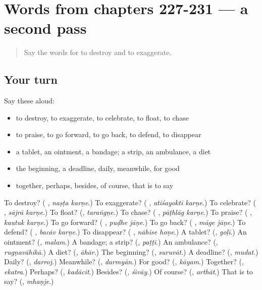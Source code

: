 \section[(dialogue)]{Words from chapters 227-231 — a second pass}

\label{lesson:MR-R231-second-pass-words-from-chapters-227-231}



\begin{quote}
Say the words for to destroy and to exaggerate.
\end{quote}

\subsection*{Your turn}
Say these aloud:

\begin{itemize}
\raggedright
  \item to destroy, to exaggerate, to celebrate, to float, to chase
  \item to praise, to go forward, to go back, to defend, to disappear
  \item a tablet, an ointment, a bandage; a strip, an ambulance, a diet
  \item the beginning, a deadline, daily, meanwhile, for good
  \item together, perhaps, besides, of course, that is to say
\end{itemize}

\begin{tcolorbox}[breakable,colback=teal!4,colframe=teal!35!black,title={Before you move on}]
To destroy? (\textbf{ }, \emph{naṣṭa karṇe}.) To exaggerate? (\textbf{ }, \emph{atiśayoktī karṇe}.) To celebrate? (\textbf{ }, \emph{sājrā karṇe}.) To float? (\textbf{}, \emph{taraṅgṇe}.) To chase? (\textbf{ }, \emph{pāṭhlāg karṇe}.) To praise? (\textbf{ }, \emph{kautuk karṇe}.) To go forward? (\textbf{ }, \emph{puḍhe jāṇe}.) To go back? (\textbf{ }, \emph{māge jāṇe}.) To defend? (\textbf{ }, \emph{bacāv karṇe}.) To disappear? (\textbf{ }, \emph{nāhīse hoṇe}.) A tablet? (\textbf{}, \emph{goḷī}.) An ointment? (\textbf{}, \emph{malam}.) A bandage; a strip? (\textbf{}, \emph{paṭṭī}.) An ambulance? (\textbf{}, \emph{rugṇavāhikā}.) A diet? (\textbf{}, \emph{āhār}.) The beginning? (\textbf{}, \emph{suruvāt}.) A deadline? (\textbf{}, \emph{mudat}.) Daily? (\textbf{}, \emph{darroj}.) Meanwhile? (\textbf{}, \emph{darmyān}.) For good? (\textbf{}, \emph{kāyam}.) Together? (\textbf{}, \emph{ekatra}.) Perhaps? (\textbf{}, \emph{kadācit}.) Besides? (\textbf{}, \emph{śivāy}.) Of course? (\textbf{}, \emph{arthāt}.) That is to say? (\textbf{}, \emph{mhaṇje}.)
\end{tcolorbox}
